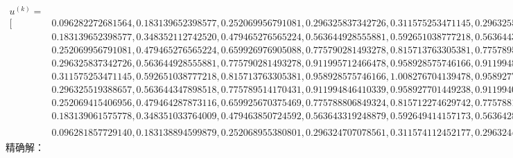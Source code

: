 \documentclass[10pt,a4paper]{article}
\begin{document}
\begin{align*}
u^{(k)}=&\\
[&0.096282272681564,0.183139652398577,0.252069956791081,0.296325837342726,0.311575253471145,0.296325519388657,0.252069415406956,0.183139061575778,0.096281857729140,\\
&0.183139652398577,0.348352112742520,0.479465276565224,0.563644928555881,0.592651038777218,0.563644347898518,0.479464287873116,0.348351033764009,0.183138894599879,\\
&0.252069956791081,0.479465276565224,0.659926976905088,0.775790281493278,0.815713763305381,0.775789514170431,0.659925670375469,0.479463850724592,0.252068955380802,\\
&0.296325837342726,0.563644928555881,0.775790281493278,0.911995712466478,0.958928575746166,0.911994846410339,0.775788806849324,0.563643319248879,0.296324707078561,\\
&0.311575253471145,0.592651038777218,0.815713763305381,0.958928575746166,1.008276704139478,0.958927701449238,0.815712274629742,0.592649414157174,0.311574112452177,\\
&0.296325519388657,0.563644347898518,0.775789514170431,0.911994846410339,0.958927701449238,0.911994048076557,0.775788154838133,0.563642864433324,0.296324477506940,\\
&0.252069415406956,0.479464287873116,0.659925670375469,0.775788806849324,0.815712274629742,0.775788154838133,0.659924560188363,0.479463076304811,0.252068564486510,\\
&0.183139061575778,0.348351033764009,0.479463850724592,0.563643319248879,0.592649414157173,0.563642864433324,0.479463076304811,0.348350188624973,0.183138468009505,\\
&0.096281857729140,0.183138894599879,0.252068955380801,0.296324707078561,0.311574112452177,0.296324477506940,0.252068564486510,0.183138468009505,0.096281558122037]^T
\end{align*}
\normalsize
精确解：
\tiny
\end{document}
